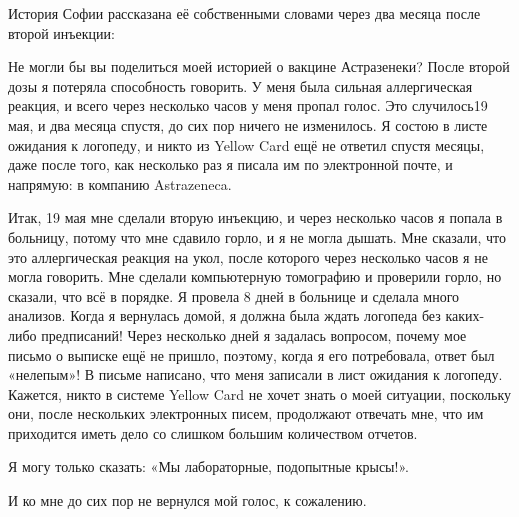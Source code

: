 История Софии рассказана её собственными словами через два месяца после второй
инъекции:

Не могли бы вы поделиться моей историей о вакцине Астразенеки? После второй дозы
я потеряла способность говорить. У меня была сильная аллергическая реакция, и
всего через несколько часов у меня пропал голос. Это случилось19 мая, и два
месяца спустя, до сих пор ничего не изменилось. Я состою в листе ожидания к
логопеду, и никто из Yellow Card ещё не ответил спустя месяцы, даже после того,
как несколько раз я писала им по электронной почте, и напрямую: в компанию
Astrazeneca.

Итак, 19 мая мне сделали вторую инъекцию, и через несколько часов я попала в
больницу, потому что мне сдавило горло, и я не могла дышать. Мне сказали, что
это аллергическая реакция на укол, после которого через несколько часов я не
могла говорить. Мне сделали компьютерную томографию и проверили горло, но
сказали, что всё в порядке. Я провела 8 дней в больнице и сделала много
анализов. Когда я вернулась домой, я должна была ждать логопеда без каких-либо
предписаний! Через несколько дней я задалась вопросом, почему мое письмо о
выписке ещё не пришло, поэтому, когда я его потребовала, ответ был «нелепым»! В
письме написано, что меня записали в лист ожидания к логопеду. Кажется, никто в
системе Yellow Card не хочет знать о моей ситуации, поскольку они, после
нескольких электронных писем, продолжают отвечать мне, что им приходится иметь
дело со слишком большим количеством отчетов.

Я могу только сказать: «Мы лабораторные, подопытные крысы!».

И ко мне до сих пор не вернулся мой голос, к сожалению.
